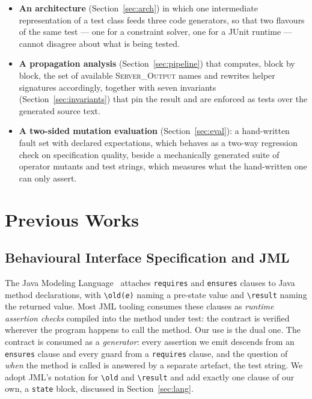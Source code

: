 \documentclass[conference]{IEEEtran}
\begin{document}
\begin{itemize}
\item \textbf{An architecture} (Section~\ref{sec:arch}) in which one intermediate
representation of a test class feeds three code generators, so that two flavours of
the same test --- one for a constraint solver, one for a JUnit runtime --- cannot
disagree about what is being tested.
\item \textbf{A propagation analysis} (Section~\ref{sec:pipeline}) that computes,
block by block, the set of available \textsc{Server\_Output} names and rewrites
helper signatures accordingly, together with seven invariants
(Section~\ref{sec:invariants}) that pin the result and are enforced as tests over
the generated source text.
\item \textbf{A two-sided mutation evaluation} (Section~\ref{sec:eval}): a
hand-written fault set with declared expectations, which behaves as a two-way
regression check on specification quality, beside a mechanically generated suite of
operator mutants and test strings, which measures what the hand-written one can only
assert.
\end{itemize}

\section{Previous Works}

\subsection{Behavioural Interface Specification and JML}

The Java Modeling Language~\cite{b1} attaches \texttt{requires} and \texttt{ensures}
clauses to Java method declarations, with \texttt{\textbackslash old(\textit{e})}
naming a pre-state value and \texttt{\textbackslash result} naming the returned
value. Most JML tooling consumes these clauses as \emph{runtime assertion checks}
compiled into the method under test: the contract is verified wherever the
program happens to call the method. Our use is the dual one. The contract is
consumed as a \emph{generator}: every assertion we emit descends from an
\texttt{ensures} clause and every guard from a \texttt{requires} clause, and the
question of \emph{when} the method is called is answered by a separate artefact,
the test string. We adopt JML's notation for \texttt{\textbackslash old} and
\texttt{\textbackslash result} and add exactly one clause of our own, a
\texttt{state} block, discussed in Section~\ref{sec:lang}.
\end{document}
